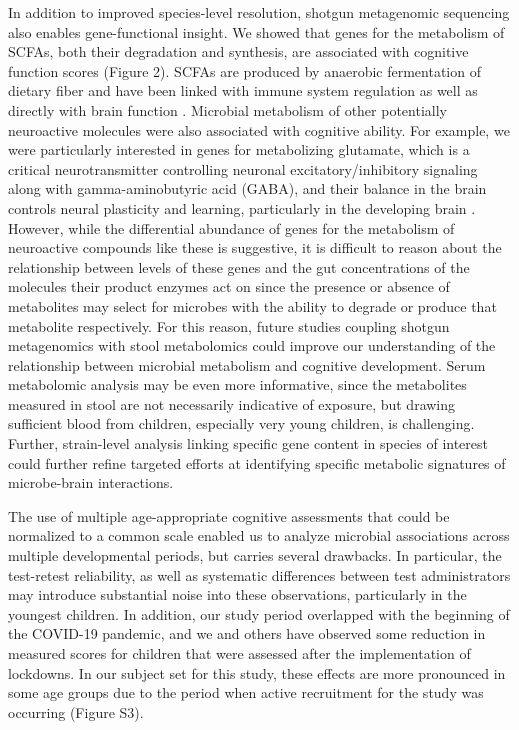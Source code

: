 \documentclass{article}
\begin{document}
In addition to improved species-level resolution, shotgun metagenomic
sequencing also enables gene-functional insight. We showed that
genes for the metabolism of SCFAs, both their degradation and synthesis,
are associated with cognitive function scores (Figure 2). 
SCFAs are produced by anaerobic fermentation of dietary fiber
and have been linked with immune system regulation as well as directly
with brain function \cite{dalileRoleShortchainFatty2019}.
Microbial metabolism of other potentially neuroactive molecules
were also associated with cognitive ability. For example, we were
particularly interested in genes for metabolizing glutamate, which is a
critical neurotransmitter controlling neuronal excitatory/inhibitory
signaling along with gamma-aminobutyric acid (GABA), and their balance
in the brain controls neural plasticity and learning, particularly in
the developing brain \cite{cohenkadoshLinkingGABAGlutamate2015,palomo-buitragoGlutamateInteractionsObesity2019}.
However, while the
differential abundance of genes for the metabolism of neuroactive
compounds like these is suggestive, it is difficult to reason about the
relationship between levels of these genes and the gut concentrations of
the molecules their product enzymes act on since the presence or absence
of metabolites may select for microbes with the ability to degrade
or produce that metabolite respectively.
For this reason, future studies coupling shotgun
metagenomics with stool metabolomics could improve our understanding of
the relationship between microbial metabolism and cognitive development.
Serum metabolomic analysis may be even more informative,
since the metabolites measured in stool are not necessarily indicative
of exposure, but drawing sufficient blood from children,
especially very young children, is challenging.
Further, strain-level analysis linking specific gene content in species
of interest could further refine targeted efforts at identifying
specific metabolic signatures of microbe-brain interactions.

The use of multiple age-appropriate cognitive assessments that could be
normalized to a common scale enabled us to analyze microbial
associations across multiple developmental periods, but carries several
drawbacks. In particular, the test-retest reliability, as well as
systematic differences between test administrators may introduce
substantial noise into these observations, particularly in the youngest
children. In addition, our study period overlapped with the beginning of
the COVID-19 pandemic, and we and others have observed some reduction in
measured scores for children that were assessed after the implementation
of lockdowns. In our subject set for this study, these effects are more
pronounced in some age groups due to the period when active recruitment for
the study was occurring
\cite{blackwellYouthWellbeingCOVID192022,deoniImpactCOVID19Pandemic2021}
(Figure S3).
\end{document}
